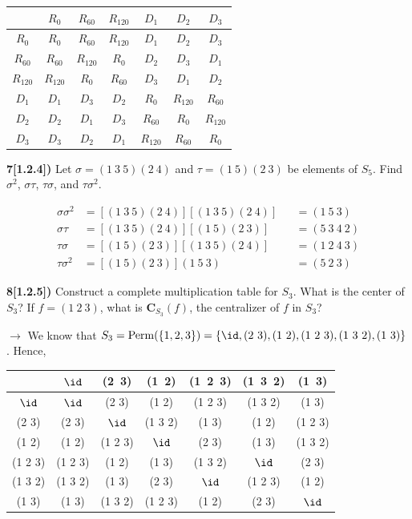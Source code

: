 \documentclass[12pt,a4paper]{article}
\newcommand{\prob}[2]{\textbf{#1)} #2}
\begin{document}
\begin{table}
 \begin{center}
  \begin{tabular}{c|cccccc}
   & $R_{0}$ & $R_{60}$ & $R_{120}$ & $D_1$ & $D_2$ & $D_3$ \\
  \hline
  $R_{0}$ & $R_{0}$ & $R_{60}$ & $R_{120}$ & $D_1$ & $D_2$ & $D_3$ \\
  $R_{60}$ & $R_{60}$ & $R_{120}$ & $R_{0}$ & $D_2$ & $D_3$ & $D_1$ \\
  $R_{120}$ & $R_{120}$ & $R_{0}$ & $R_{60}$ & $D_3$ & $D_1$ & $D_2$ \\
  $D_1$ & $D_1$ & $D_3$ & $D_2$ & $R_{0}$ & $R_{120}$ & $R_{60}$ \\
  $D_2$ & $D_2$ & $D_1$ & $D_3$ & $R_{60}$ & $R_{0}$ & $R_{120}$ \\
  $D_3$ & $D_3$ & $D_2$ & $D_1$ & $R_{120}$ & $R_{60}$ & $R_{0}$ \\
  \end{tabular}
 \end{center}
\end{table}

\prob{7[1.2.4]}{Let $\sigma = (1~3~5)(2~4)$ and $\tau = (1~5)(2~3)$ be elements of $S_5$. Find $\sigma^2$, $\sigma\tau$, $\tau\sigma$, and $\tau\sigma^2$.}

\begin{alignat*}
\sigma \sigma^2 &= [(1~3~5)(2~4)][(1~3~5)(2~4)] &&= (1~5~3) \\
\sigma\tau &= [(1~3~5)(2~4)][(1~5)(2~3)] &&= (5~3~4~2) \\
\tau\sigma &= [(1~5)(2~3)][(1~3~5)(2~4)] &&= (1~2~4~3) \\
\tau\sigma^2 &= [(1~5)(2~3)](1~5~3) &&= (5~2~3)
\end{alignat*}

\prob{8[1.2.5]}{Construct a complete multiplication table for $S_3$. What is the center of $S_3$? If $f = (1~2~3)$, what is $\mathbf{C}_{S_3}(f)$, the centralizer of $f$ in $S_3$?}

$\rightarrow$ We know that $S_3 = {\rm Perm}(\{1,2,3\}) = \{\id,(2~3),(1~2),(1~2~3),(1~3~2),(1~3)\}$. Hence,
\begin{table}[H]
 \begin{center}
  \begin{tabular}{c|cccccc}
   & $\id$ & (2~3) & (1~2) & (1~2~3) & (1~3~2) & (1~3) \\
  \hline
  $\id$ & $\id$ & (2 3) & (1 2) & (1 2 3) & (1 3 2) & (1 3) \\
  (2 3) & (2 3) & $\id$ & (1 3 2) & (1 3) & (1 2) & (1 2 3) \\
  (1 2) & (1 2) & (1 2 3) & $\id$ & (2 3) & (1 3) & (1 3 2) \\
  (1 2 3) & (1 2 3) & (1 2) & (1 3) & (1 3 2) & $\id$ & (2 3) \\
  (1 3 2) & (1 3 2) & (1 3) & (2 3) & $\id$ & (1 2 3) & (1 2) \\
  (1 3) & (1 3) & (1 3 2) & (1 2 3) & (1 2) & (2 3) & $\id$ \\
  \end{tabular}
 \end{center}
\end{table}
\end{document}
